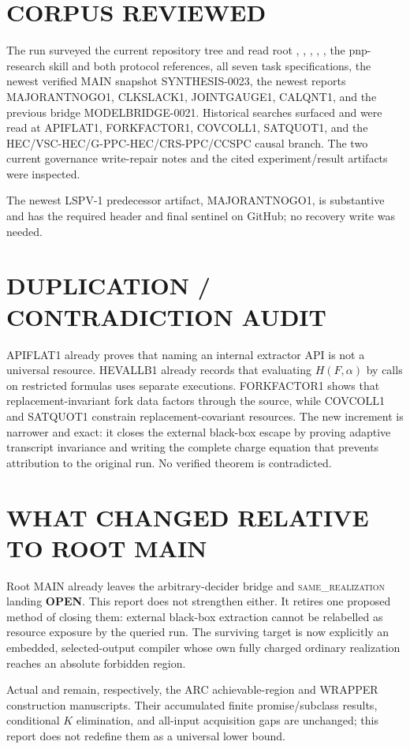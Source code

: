 \documentclass[11pt]{article}
\newcommand{\OPEN}{\textbf{OPEN}}
\newcommand{\same}{\textsc{same\_realization}}
\begin{document}
\section{CORPUS REVIEWED}
The run surveyed the current repository tree and read root
, , , ,
, the pnp-research skill and both protocol references, all
seven task specifications, the newest verified MAIN snapshot
SYNTHESIS-0023, the newest reports MAJORANTNOGO1, CLKSLACK1, JOINTGAUGE1,
CALQNT1, and the previous bridge MODELBRIDGE-0021.  Historical searches
surfaced and were read at APIFLAT1, FORKFACTOR1, COVCOLL1, SATQUOT1, and the
HEC/VSC-HEC/G-PPC-HEC/CRS-PPC/CCSPC causal branch.  The two current governance
write-repair notes and the cited experiment/result artifacts were inspected.

The newest LSPV-1 predecessor artifact, MAJORANTNOGO1, is substantive and has
the required header and final sentinel on GitHub; no recovery write was
needed.

\section{DUPLICATION / CONTRADICTION AUDIT}
APIFLAT1 already proves that naming an internal extractor API is not a
universal resource.  HEVALLB1 already records that evaluating $H(F,\alpha)$
by calls on restricted formulas uses separate executions.  FORKFACTOR1 shows
that replacement-invariant fork data factors through the source, while
COVCOLL1 and SATQUOT1 constrain replacement-covariant resources.  The new
increment is narrower and exact: it closes the external black-box escape by
proving adaptive transcript invariance and writing the complete charge
equation that prevents attribution to the original run.  No verified theorem
is contradicted.

\section{WHAT CHANGED RELATIVE TO ROOT MAIN}
Root MAIN already leaves the arbitrary-decider bridge and
\same{} landing \OPEN.  This report does not strengthen either.  It retires
one proposed method of closing them: external black-box extraction cannot be
relabelled as resource exposure by the queried run.  The surviving target is
now explicitly an embedded, selected-output compiler whose own fully charged
ordinary realization reaches an absolute forbidden region.

Actual  and  remain, respectively, the ARC
achievable-region and WRAPPER construction manuscripts.  Their accumulated
finite promise/subclass results, conditional $K$ elimination, and all-input
acquisition gaps are unchanged; this report does not redefine them as a
universal lower bound.
\end{document}

